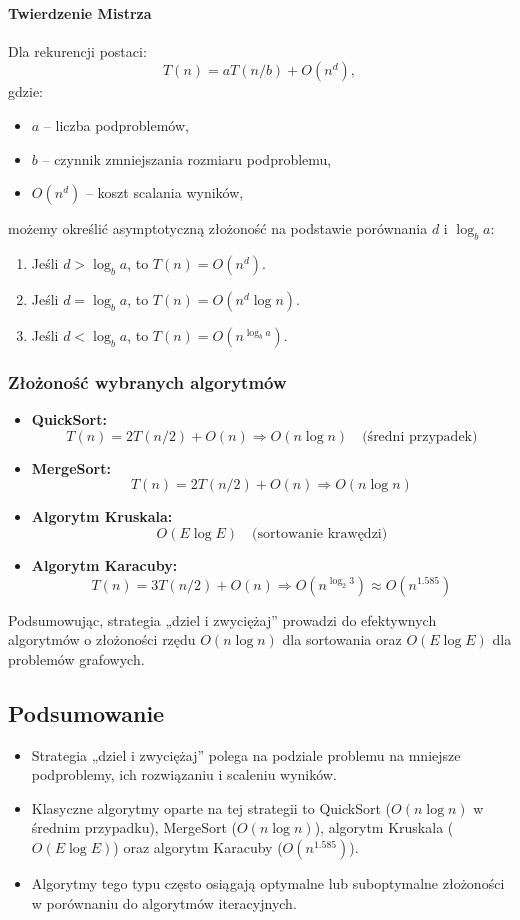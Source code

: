 \paragraph{Twierdzenie Mistrza}
Dla rekurencji postaci:
\[
T(n) = aT(n/b) + O(n^d),
\]
gdzie:
\begin{itemize}
    \item \( a \) – liczba podproblemów,
    \item \( b \) – czynnik zmniejszania rozmiaru podproblemu,
    \item \( O(n^d) \) – koszt scalania wyników, 
 \end{itemize}   
    możemy określić asymptotyczną złożoność na podstawie porównania \( d \) i \( \log_b a \):

\begin{enumerate}
    \item Jeśli \( d > \log_b a \), to \( T(n) = O(n^d) \).
    \item Jeśli \( d = \log_b a \), to \( T(n) = O(n^d \log n) \).
    \item Jeśli \( d < \log_b a \), to \( T(n) = O(n^{\log_b a}) \).
\end{enumerate}

\subsubsection{Złożoność wybranych algorytmów}
\begin{itemize}
    \item \textbf{QuickSort:}  
    \[
    T(n) = 2T(n/2) + O(n) \Rightarrow O(n \log n) \quad \text{(średni przypadek)}
    \]
    \item \textbf{MergeSort:}  
    \[
    T(n) = 2T(n/2) + O(n) \Rightarrow O(n \log n)
    \]
    \item \textbf{Algorytm Kruskala:}  
    \[
    O(E \log E) \quad \text{(sortowanie krawędzi)}
    \]
    \item \textbf{Algorytm Karacuby:}  
    \[
    T(n) = 3T(n/2) + O(n) \Rightarrow O(n^{\log_2 3}) \approx O(n^{1.585})
    \]
\end{itemize}

Podsumowując, strategia „dziel i zwyciężaj” prowadzi do efektywnych algorytmów o złożoności rzędu \( O(n \log n) \) dla sortowania oraz \( O(E \log E) \) dla problemów grafowych.

\subsection{Podsumowanie}
\begin{itemize}
    \item Strategia „dziel i zwyciężaj” polega na podziale problemu na mniejsze podproblemy, ich rozwiązaniu i scaleniu wyników.
    \item Klasyczne algorytmy oparte na tej strategii to QuickSort (\( O(n \log n) \) w średnim przypadku), MergeSort (\( O(n \log n) \)), algorytm Kruskala (\( O(E \log E) \)) oraz algorytm Karacuby (\( O(n^{1.585}) \)).
    \item Algorytmy tego typu często osiągają optymalne lub suboptymalne złożoności w porównaniu do algorytmów iteracyjnych.
\end{itemize}